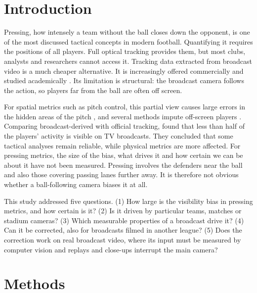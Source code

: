 \documentclass[]{interact}
\begin{document}
\section{Introduction}

Pressing, how intensely a team without the ball closes down the opponent, is one of the most discussed tactical
concepts in modern football. Quantifying it requires the positions of all players. Full optical tracking provides
them, but most clubs, analysts and researchers cannot access it. Tracking data extracted from broadcast video is a much
cheaper alternative. It is increasingly offered commercially and studied academically
\citep{somers2024gsr,smf2025broadcast}. Its limitation is structural: the broadcast camera follows the action, so
players far from the ball are often off screen.

For spatial metrics such as pitch control, this partial view causes large errors in the hidden areas of the pitch
\citep{offscreen2026}, and several methods impute off-screen players
\citep{omidshafiei2022graphimputer,rsos2025continuous,offscreen2026}. Comparing broadcast-derived with official
tracking, \citet{smf2025broadcast} found that less than half of the players' activity is visible on TV broadcasts.
They concluded that some tactical analyses remain reliable, while physical metrics are more affected. For pressing
metrics, the size of the bias, what drives it and how certain we can be about it have not been measured. Pressing
involves the defenders near the ball and also those covering passing lanes further away. It is therefore not obvious
whether a ball-following camera biases it at all.

This study addressed five questions. (1) How large is the visibility bias in pressing metrics, and how certain is it?
(2) Is it driven by particular teams, matches or stadium cameras? (3) Which measurable properties of a broadcast drive
it? (4) Can it be corrected, also for broadcasts filmed in another league? (5) Does the correction work on real
broadcast video, where its input must be measured by computer vision and replays and close-ups interrupt the main
camera?

\section{Methods}
\end{document}
